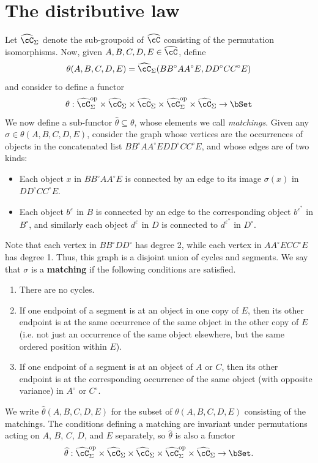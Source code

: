 \documentclass{amsart}
\newcommand{\C}{\cC}
\renewcommand{\Chat}{\ensuremath{\widehat{\C}}\xspace}
\newcommand{\Chats}{\ensuremath{\Chat_{\Sigma}}\xspace}
\newcommand{\thhat}{\ensuremath{\widehat{\theta}}\xspace}
\renewcommand{\o}{^{\circ}}
\newcommand{\e}[1][]{^{\varepsilon_{#1}}}
\newcommand{\epbar}{^{\varepsilon^*}}
\begin{document}
\section{The distributive law}
\label{sec:dl}


Let $\Chats$ denote the sub-groupoid of \Chat consisting of the permutation isomorphisms.
Now, given $A,B,C,D,E\in\Chat$, define
\[ \theta(A,B,C,D,E) = \Chats(B B\o A A\o E, D D\o C C\o E) \]
and consider \theta to define a functor
\[ \theta : \Chats\op \times \Chats \times \Chats \times \Chats\op \times \Chats \to \bSet \]
We now define a sub-functor $\thhat \subseteq \theta$, whose elements we call \emph{matchings}.
Given any $\sigma\in\theta(A,B,C,D,E)$, consider the graph whose vertices are the occurrences of objects in the concatenated list $B B\o A A\o E D D\o C C\o E$, and whose edges are of two kinds:
\begin{itemize}
\item Each object $x$ in $B B\o A A\o E$ is connected by an edge to its image $\sigma(x)$ in $D D\o C C\o E$.
\item Each object $b\e$ in $B$ is connected by an edge to the corresponding object $b\epbar$ in $B\o$, and similarly each object $d\e$ in $D$ is connected to $d\epbar$ in $D\o$.
\end{itemize}
Note that each vertex in $B B\o D D\o$ has degree 2, while each vertex in $A A\o E C C\o E$ has degree 1.
Thus, this graph is a disjoint union of cycles and segments.
We say that $\sigma$ is a \textbf{matching} if the following conditions are satisfied.
\begin{enumerate}
\item There are no cycles.
\item If one endpoint of a segment is at an object in one copy of $E$, then its other endpoint is at the same occurrence of the same object in the other copy of $E$ (i.e. not just an occurrence of the same object elsewhere, but the same ordered position within $E$).
\item If one endpoint of a segment is at an object of $A$ or $C$, then its other endpoint is at the corresponding occurrence of the same object (with opposite variance) in $A\o$ or $C\o$.
\end{enumerate}
We write $\thhat(A,B,C,D,E)$ for the subset of $\theta(A,B,C,D,E)$ consisting of the matchings.
The conditions defining a matching are invariant under permutations acting on $A$, $B$, $C$, $D$, and $E$ separately, so $\thhat$ is also a functor
\[ \thhat : \Chats\op \times \Chats \times \Chats \times \Chats\op \times \Chats \to \bSet. \]
\end{document}
